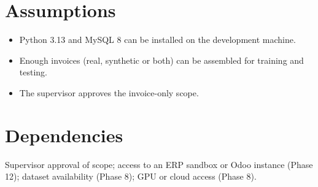 \documentclass[11pt,a4paper]{report}
\begin{document}
\section{Assumptions}
\begin{itemize}
\item Python 3.13 and MySQL 8 can be installed on the development machine.
\item Enough invoices (real, synthetic or both) can be assembled for training and testing.
\item The supervisor approves the invoice-only scope.
\end{itemize}
\section{Dependencies}
Supervisor approval of scope; access to an ERP sandbox or Odoo instance (Phase 12); dataset availability (Phase 8); GPU or cloud access (Phase 8).
\end{document}
